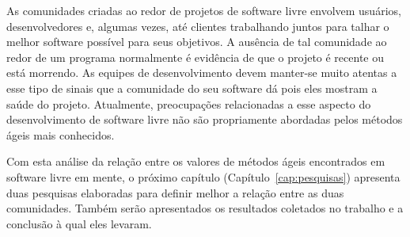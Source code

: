 As comunidades criadas ao redor de projetos de software livre envolvem
usuários, desenvolvedores e, algumas vezes, até clientes trabalhando
juntos para talhar o melhor software possível para seus objetivos. A
ausência de tal comunidade ao redor de um programa normalmente é
evidência de que o projeto é recente ou está morrendo. As equipes de
desenvolvimento devem manter-se muito atentas a esse tipo de sinais
que a comunidade do seu software dá pois eles mostram a saúde do
projeto. Atualmente, preocupações relacionadas a esse aspecto do
desenvolvimento de software livre não são propriamente abordadas pelos
métodos ágeis mais conhecidos.

Com esta análise da relação entre os valores de métodos ágeis
encontrados em software livre em mente, o próximo capítulo
(Capítulo~\ref{cap:pesquisas}) apresenta duas pesquisas elaboradas
para definir melhor a relação entre as duas comunidades. Também serão
apresentados os resultados coletados no trabalho e a conclusão à qual
eles levaram.
